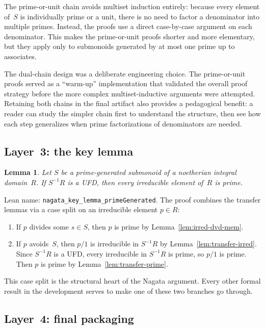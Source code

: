 \documentclass[11pt]{article}
\theoremstyle{plain}
\newtheorem{lemma}[theorem]{Lemma}
\theoremstyle{definition}
\theoremstyle{remark}
\newcommand{\li}[1]{\texorpdfstring{\texttt{#1}}{#1}}
\begin{document}
\noindent
The prime-or-unit chain avoids multiset induction entirely: because every
element of~$S$ is individually prime or a unit, there is no need to factor a
denominator into multiple primes.  Instead, the proofs use a direct
case-by-case argument on each denominator.  This makes the prime-or-unit proofs
shorter and more elementary, but they apply only to submonoids generated by at
most one prime up to associates.

The dual-chain design was a deliberate engineering choice.  The prime-or-unit
proofs served as a ``warm-up'' implementation that validated the overall proof
strategy before the more complex multiset-inductive arguments were attempted.
Retaining both chains in the final artifact also provides a pedagogical
benefit: a reader can study the simpler chain first to understand the structure,
then see how each step generalizes when prime factorizations of denominators are
needed.


\subsection{Layer~3: the key lemma}\label{sec:layer3}

\begin{lemma}\label{lem:key}
Let $S$ be a prime-generated submonoid of a noetherian integral domain~$R$.  If
$S^{-1}R$ is a UFD, then every irreducible element of~$R$ is prime.
\end{lemma}

\noindent
Lean name: \li{nagata\_key\_lemma\_primeGenerated}.  The proof combines the
transfer lemmas via a case split on an irreducible element $p\in R$:
\begin{enumerate}[nosep]
\item If $p$ divides some $s\in S$, then $p$ is prime by
  Lemma~\ref{lem:irred-dvd-mem}.
\item If $p$ avoids~$S$, then $p/1$ is irreducible in $S^{-1}R$ by
  Lemma~\ref{lem:transfer-irred}.  Since $S^{-1}R$ is a UFD, every
  irreducible in $S^{-1}R$ is prime, so $p/1$ is prime.  Then $p$ is prime by
  Lemma~\ref{lem:transfer-prime}.
\end{enumerate}
This case split is the structural heart of the Nagata argument.  Every other
formal result in the development serves to make one of these two branches go
through.


\subsection{Layer~4: final packaging}\label{sec:layer4}
\end{document}

